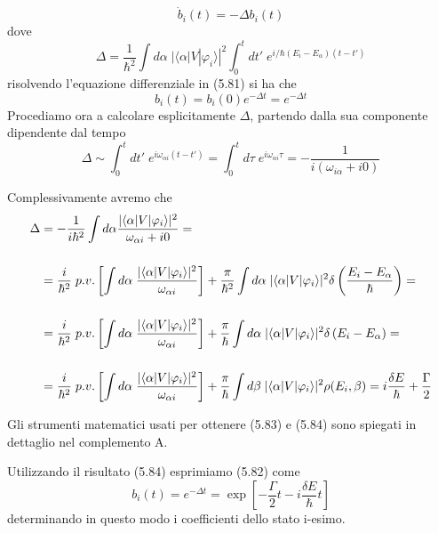 \begin{equation}
	\dot{b}_i(t) = - \Delta b_i(t)
\end{equation}
dove 
\begin{equation*}
	\Delta = \frac{1}{\hbar^2}\int d\alpha \; |\langle \alpha |V|\varphi_i \rangle|^2 \int_0^t dt' \; e^{i/\hbar (E_i - E_{\alpha})(t-t')}
\end{equation*}
risolvendo l'equazione differenziale in (5.81) si ha che
\begin{equation}
	b_i(t) = b_i(0)e^{-\Delta t} = e^{- \Delta t}
\end{equation}
Procediamo ora a calcolare esplicitamente $\Delta$, partendo dalla sua componente dipendente dal tempo 
\begin{equation}
	\Delta \sim \int_0^t dt' \;  e^{i\omega_{\alpha i}(t-t')} = \int_0^t d\tau \; e^{i\omega_{\alpha i}\tau} = - \frac{1}{i(\omega_{i\alpha}+i0)}
\end{equation}

\newpage
Complessivamente avremo che 
\begin{align}
	\Delta & = - \frac{1}{i \hbar^2}\int d\alpha  \frac{|\langle \alpha |V|\varphi_i \rangle|^2}{\omega_{\alpha i}+i0} = \notag \\[0.5cm]
	& = \frac{i}{\hbar^2}\;p.v. \left [ \int d \alpha \; \frac{|\langle \alpha |V|\varphi_i \rangle|^2}{\omega_{\alpha i}}\right] + \frac{\pi }{\hbar^2} \int d\alpha \; |\langle \alpha |V|\varphi_i \rangle|^2 \delta \left( \frac{E_i - E_{\alpha}}{\hbar} \right) =  \notag \\[0.5cm]
	& = \frac{i}{\hbar^2}\;p.v. \left [ \int d \alpha \; \frac{|\langle \alpha |V|\varphi_i \rangle|^2}{\omega_{\alpha i}}\right] + \frac{\pi }{\hbar} \int d\alpha \; |\langle \alpha |V|\varphi_i \rangle|^2 \delta \left( E_i - E_{\alpha} \right) = \notag \\[0.5cm]
	& = \frac{i}{\hbar^2}\;p.v. \left [ \int d \alpha \; \frac{|\langle \alpha |V|\varphi_i \rangle|^2}{\omega_{\alpha i}}\right] + \frac{\pi }{\hbar} \int d\beta \; |\langle \alpha |V|\varphi_i \rangle|^2 \rho(E_i,\beta) = i \frac{\delta E}{\hbar} + \frac{\Gamma}{2}
\end{align}
\begin{remark}
Gli strumenti matematici usati per ottenere (5.83) e (5.84) sono spiegati in dettaglio nel complemento A.
\end{remark}

Utilizzando il risultato (5.84) esprimiamo (5.82) come
\begin{equation}
	b_i(t) = e^{-\Delta t} = \exp \left[ - \frac{\Gamma}{2}t -i \frac{\delta E}{\hbar}t\right]
\end{equation}
determinando in questo modo i coefficienti dello stato i-esimo.


